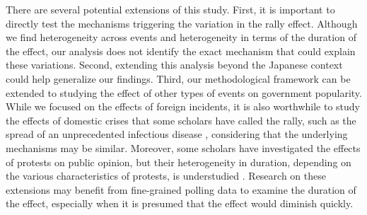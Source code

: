 \documentclass[letterpaper,12pt]{scrartcl}
\begin{document}
There are several potential extensions of this study. First, it is important to directly test the mechanisms triggering the variation in the rally effect. Although we find heterogeneity across events and heterogeneity in terms of the duration of the effect, our analysis does not identify the exact mechanism that could explain these variations. Second, extending this analysis beyond the Japanese context could help generalize our findings. Third, our methodological framework can be extended to studying the effect of other types of events on government popularity. While we focused on the effects of foreign incidents, it is also worthwhile to study the effects of domestic crises that some scholars have called the rally, such as the spread of an unprecedented infectious disease \citep[e.g.,][]{Kritzinger2021WestEurPolit,Yam2020PNAS}, considering that the underlying mechanisms may be similar. Moreover, some scholars have investigated the effects of protests on public opinion, but their heterogeneity in duration, depending on the various characteristics of protests, is understudied \citep{wallace2014,jimenez-sanchez2022}. Research on these extensions may benefit from fine-grained polling data to examine the duration of the effect, especially when it is presumed that the effect would diminish quickly.

\clearpage


\end{document}
